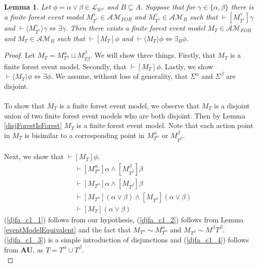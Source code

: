 \documentclass[12pt, a4paper, titlepage]{article}
\newtheorem{lemma}{Lemma}[subsection]
\numberwithin{equation}{section}
\newcommand{\sqex}[1]{[{#1}]}
\newcommand{\anex}[1]{\langle {#1} \rangle}
\newcommand{\lang}{\mathcal{L}}
\newcommand{\langArbAct}{\lang_{\otimes\forall}}
\newcommand{\axAU}{{\bf AU}}
\newcommand{\eventClass}{\mathcal{AM}}
\newcommand{\forestClass}{\eventClass_{FOR}}
\begin{document}
\begin{lemma} \label{disjunctionFormulaAchievementK}
Let $\phi = \alpha \lor \beta \in \langArbAct$ and $B \subseteq A$.
Suppose that for $\gamma \in \{\alpha, \beta\}$ there is a finite forest event model
$M^\gamma_{T^\gamma} \in \forestClass$ and $M^\gamma_{T^\gamma} \in \eventClass_B$ such that
$\vdash \sqex{M^\gamma_{T^\gamma}} \gamma$
and $\vdash \anex{ M^\gamma_{T^\gamma} } \gamma \iff \exists \gamma$.
Then there exists a finite forest event model $M_T \in \forestClass$ and $M_T \in \eventClass_B$
such that $\vdash \sqex{M_T}\phi$ and $\vdash \anex{ M_T } \phi \iff \exists_B \phi$.
\end{lemma}

\begin{proof}
Let $M_T = M^\alpha_{T^\alpha} \sqcup M^\beta_{T\beta}$.
We will show three things.
Firstly, that $M_T$ is a finite forest event model.
Secondly, that $\vdash \sqex{M_T}\phi$.
Lastly, we show $\vdash \anex{ M_T } \phi \iff \exists \phi$.
We assume, without loss of generality, that $\Sigma^\alpha$ and $\Sigma^\beta$ are disjoint.\\
\\
To show that $M_T$ is a finite forest event model, we observe that $M_T$ is a disjoint union of two
finite forest event models who are both disjoint.
Then by Lemma \ref{disjForestIsForest} $M_T$ is a finite forest event model.
Note that each action point in $M_T$ is bisimilar to a corresponding point in $M^\alpha_{T^\alpha}$ or
$M^\beta_{T^\beta}$.\\
\\
Next, we show that $\vdash \sqex{M_T}\phi$.
\begin{align}
	&\vdash \sqex{M^\alpha_{T^\alpha}}\alpha \land \sqex{M^\beta_{T^\beta}}\beta \label{djfa_c1_1}\\
	&\vdash \sqex{M_{T^\alpha}}\alpha \land \sqex{M_{T^\beta}}\beta \label{djfa_c1_2}\\
	&\vdash \sqex{M_{T^\alpha}}(\alpha \lor \beta) \land \sqex{M_{T^\beta}}(\alpha \lor \beta) \label{djfa_c1_3} \\
	&\vdash \sqex{M_T}(\alpha \lor \beta) \label{djfa_c1_4}
\end{align}
(\ref{djfa_c1_1}) follows from our hypothesis, (\ref{djfa_c1_2}) follows from Lemma \ref{eventModelEquivalent} and the fact that
$M_{T^\alpha} \sim M^\alpha_{T^\alpha}$ and $M_{T^\beta} \sim M^\beta{T^\beta}$.
(\ref{djfa_c1_3}) is a simple introduction of disjunctions and (\ref{djfa_c1_4}) follows from \axAU, as
$T = T^\alpha \cup T^\beta$.\\

\end{proof}
\end{document}
